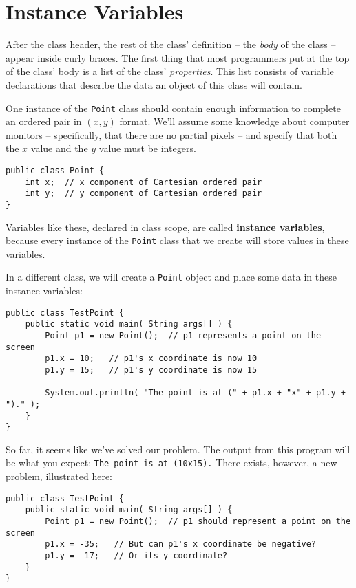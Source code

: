 \section{Instance Variables}

After the class header, the rest of the class' definition -- the \textit{body} of the class -- appear inside curly braces.  The first thing that most programmers put at the top of the class' body is a list of the class' \textit{properties}.  This list consists of variable declarations that describe the data an object of this class will contain.

One instance of the \texttt{Point} class should contain enough information to complete an ordered pair in $(x,y)$ format.  We'll assume some knowledge about computer monitors -- specifically, that there are no partial pixels -- and specify that both the $x$ value and the $y$ value must be integers.

\begin{verbatim}
public class Point {
    int x;  // x component of Cartesian ordered pair
    int y;  // y component of Cartesian ordered pair
}
\end{verbatim}

Variables like these, declared in class scope, are called \textbf{instance variables}, because every instance of the \texttt{Point} class that we create will store values in these variables.

In a different class, we will create a \texttt{Point} object and place some data in these instance variables:

\begin{verbatim}
public class TestPoint {
    public static void main( String args[] ) {
        Point p1 = new Point();  // p1 represents a point on the screen
        p1.x = 10;   // p1's x coordinate is now 10
        p1.y = 15;   // p1's y coordinate is now 15

        System.out.println( "The point is at (" + p1.x + "x" + p1.y + ")." );
    }
}
\end{verbatim}

So far, it seems like we've solved our problem.  The output from this program will be what you expect: \texttt{The point is at (10x15).}  There exists, however, a new problem, illustrated here:

\begin{verbatim}
public class TestPoint {
    public static void main( String args[] ) {
        Point p1 = new Point();  // p1 should represent a point on the screen
        p1.x = -35;   // But can p1's x coordinate be negative?
        p1.y = -17;   // Or its y coordinate?
    }
}
\end{verbatim}

